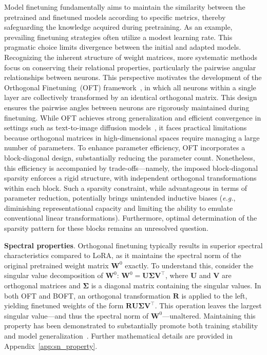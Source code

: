 Model finetuning fundamentally aims to maintain the similarity between the pretrained and finetuned models according to specific metrics, thereby safeguarding the knowledge acquired during pretraining. As an example, prevailing finetuning strategies often utilize a modest learning rate. This pragmatic choice limits divergence between the initial and adapted models. Recognizing the inherent structure of weight matrices, more systematic methods focus on conserving their relational properties, particularly the pairwise angular relationships between neurons. This perspective motivates the development of the Orthogonal Finetuning~(OFT) framework~\cite{qiu2023controlling}, in which all neurons within a single layer are collectively transformed by an identical orthogonal matrix. This design ensures the pairwise angles between neurons are rigorously maintained during finetuning. While OFT achieves strong generalization and efficient convergence in settings such as text-to-image diffusion models~\cite{qiu2023controlling}, it faces practical limitations because orthogonal matrices in high-dimensional spaces require managing a large number of parameters. To enhance parameter efficiency, OFT incorporates a block-diagonal design, substantially reducing the parameter count. Nonetheless, this efficiency is accompanied by trade-offs—namely, the imposed block-diagonal sparsity enforces a rigid structure, with independent orthogonal transformations within each block. Such a sparsity constraint, while advantageous in terms of parameter reduction, potentially brings unintended inductive biases (\emph{e.g.}, diminishing representational capacity and limiting the ability to emulate conventional linear transformations). Furthermore, optimal determination of the sparsity pattern for these blocks remains an unresolved question.

\textbf{Spectral properties}. Orthogonal finetuning typically results in superior spectral characteristics compared to LoRA, as it maintains the spectral norm of the original pretrained weight matrix $\bm{W}^0$ exactly. To understand this, consider the singular value decomposition of $\bm{W}^0$: $\bm{W}^0=\bm{U}\bm{\Sigma}\bm{V}^\top$, where $\bm{U}$ and $\bm{V}$ are orthogonal matrices and $\bm{\Sigma}$ is a diagonal matrix containing the singular values. In both OFT and BOFT, an orthogonal transformation $\bm{R}$ is applied to the left, yielding finetuned weights of the form $\bm{R}\bm{U}\bm{\Sigma}\bm{V}^\top$. This operation leaves the largest singular value—and thus the spectral norm of $\bm{W}^0$—unaltered. Maintaining this property has been demonstrated to substantially promote both training stability and model generalization~\cite{miyato2018spectral,yoshida2017spectral}. Further mathematical details are provided in Appendix~\ref{app:sn_property}.

